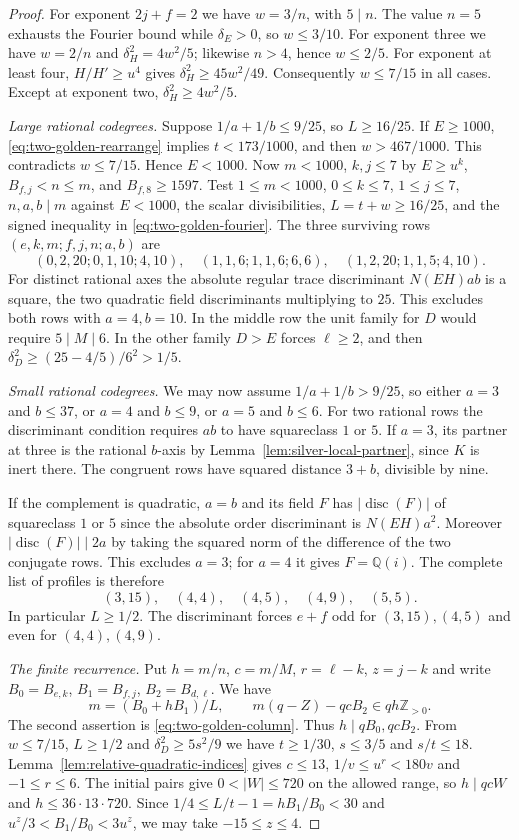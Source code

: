 \documentclass[11pt,reqno]{amsart}
\theoremstyle{remark}\newtheorem{remark}[theorem]{Remark}
\numberwithin{equation}{section}
\begin{document}
\begin{proof}
For exponent $2j+f=2$ we have $w=3/n$, with $5\mid n$. The value $n=5$ exhausts the Fourier bound while $\delta_E>0$, so $w\le3/10$. For exponent three we have $w=2/n$ and $\delta_H^2=4w^2/5$; likewise $n>4$, hence $w\le2/5$. For exponent at least four, $H/H'\ge u^4$ gives $\delta_H^2\ge45w^2/49$. Consequently $w\le7/15$ in all cases. Except at exponent two, $\delta_H^2\ge4w^2/5$.

\smallskip\emph{Large rational codegrees.}
Suppose $1/a+1/b\le9/25$, so $L\ge16/25$. If $E\ge1000$, \eqref{eq:two-golden-rearrange} implies $t<173/1000$, and then $w>467/1000$. This contradicts $w\le7/15$. Hence $E<1000$. Now $m<1000$, $k,j\le7$ by $E\ge u^k$, $B_{f,j}<n\le m$, and $B_{f,8}\ge1597$. Test $1\le m<1000$, $0\le k\le7$, $1\le j\le7$, $n,a,b\mid m$ against $E<1000$, the scalar divisibilities, $L=t+w\ge16/25$, and the signed inequality in \eqref{eq:two-golden-fourier}. The three surviving rows $(e,k,m;f,j,n;a,b)$ are
\[
 (0,2,20;0,1,10;4,10),\quad (1,1,6;1,1,6;6,6),\quad (1,2,20;1,1,5;4,10).
\]
For distinct rational axes the absolute regular trace discriminant $N(EH)ab$ is a square, the two quadratic field discriminants multiplying to $25$. This excludes both rows with $a=4,b=10$. In the middle row the unit family for $D$ would require $5\mid M\mid6$. In the other family $D>E$ forces $\ell\ge2$, and then $\delta_D^2\ge(25-4/5)/6^2>1/5$.

\smallskip\emph{Small rational codegrees.}
We may now assume $1/a+1/b>9/25$, so either $a=3$ and $b\le37$, or $a=4$ and $b\le9$, or $a=5$ and $b\le6$. For two rational rows the discriminant condition requires $ab$ to have squareclass $1$ or $5$. If $a=3$, its partner at three is the rational $b$-axis by
Lemma~\ref{lem:silver-local-partner}, since $K$ is inert there.
The congruent rows have squared distance $3+b$, divisible by nine.

If the complement is quadratic, $a=b$ and its field $F$ has $|\operatorname{disc}(F)|$ of squareclass $1$ or $5$ since the absolute order discriminant is $N(EH)a^2$. Moreover $|\operatorname{disc}(F)|\mid2a$ by taking the squared norm of the difference of the two conjugate rows. This excludes $a=3$; for $a=4$ it gives $F=\mathbb Q(i)$. The complete list of profiles is therefore
\[
 (3,15),\quad(4,4),\quad(4,5),\quad(4,9),\quad (5,5).
\]
In particular $L\ge1/2$. The discriminant forces $e+f$ odd for $(3,15),(4,5)$ and even for $(4,4),(4,9)$.

\smallskip\emph{The finite recurrence.}
Put $h=m/n$, $c=m/M$, $r=\ell-k$, $z=j-k$ and write $B_0=B_{e,k}$, $B_1=B_{f,j}$, $B_2=B_{d,\ell}$. We have
\begin{equation}\label{eq:golden-two-integrality}
 m=(B_0+hB_1)/L,\qquad m(q-Z)-qcB_2\in qh\mathbb Z_{>0}.
\end{equation}
The second assertion is \eqref{eq:two-golden-column}. Thus $h\mid qB_0,qcB_2$. From $w\le7/15$, $L\ge1/2$ and
$\delta_D^2\ge5s^2/9$ we have $t\ge1/30$, $s\le3/5$ and
$s/t\le18$. Lemma~\ref{lem:relative-quadratic-indices} gives
$c\le13$, $1/v\le u^r<180v$ and $-1\le r\le6$. The initial
pairs give $0<|W|\le720$ on the allowed range, so $h\mid qcW$
and $h\le36\cdot13\cdot720$. Since $1/4\le L/t-1=hB_1/B_0<30$
and $u^z/3<B_1/B_0<3u^z$, we may take $-15\le z\le4$.


\end{proof}
\end{document}
